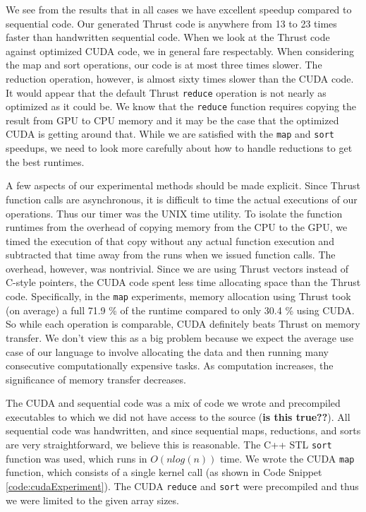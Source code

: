 \documentclass[twocolumn]{article}
\renewcommand{\|}{\origbar} %
\newcommand{\code}[1]{\texttt{#1}}
\begin{document}
We see from the results that in all cases we have excellent speedup compared to sequential code. Our generated Thrust code is anywhere from 13 to 23 times faster than handwritten sequential code. When we look at the Thrust code against optimized CUDA code, we in general fare respectably. When considering the map and sort operations, our code is at most three times slower. The reduction operation, however, is almost sixty times slower than the CUDA code. It would appear that the default Thrust \code{reduce} operation is not nearly as optimized as it could be. We know that the \code{reduce} function requires copying the result from GPU to CPU memory and it may be the case that the optimized CUDA is getting around that. While we are satisfied with the \code{map} and \code{sort} speedups, we need to look more carefully about how to handle reductions to get the best runtimes. 

A few aspects of our experimental methods should be made explicit. Since Thrust function calls are asynchronous, it is difficult to time the actual executions of our operations. Thus our timer was the UNIX time utility. To isolate the function runtimes from the overhead of copying memory from the CPU to the GPU, we timed the execution of that copy without any actual function execution and subtracted that time away from the runs when we issued function calls. The overhead, however, was nontrivial. Since we are using Thrust vectors instead of C-style pointers, the CUDA code spent less time allocating space than the Thrust code. Specifically, in the \code{map} experiments, memory allocation using Thrust took (on average) a full 71.9 \% of the runtime compared to only 30.4 \% using CUDA. So while each operation is comparable, CUDA definitely beats Thrust on memory transfer. We don't view this as a big problem because we expect the average use case of our language to involve allocating the data and then running many consecutive computationally expensive tasks. As computation increases, the significance of memory transfer decreases.

The CUDA and sequential code was a mix of code we wrote and precompiled executables to which we did not have access to the source ({\bf is this true??}). All sequential code was handwritten, and since sequential maps, reductions, and sorts are very straightforward, we believe this is reasonable. The C++ STL \code{sort} function was used, which runs in $O(nlog(n))$ time. We wrote the CUDA \code{map} function, which consists of a single kernel call (as shown in Code Snippet \ref{code:cudaExperiment}). The CUDA \code{reduce} and \code{sort} were precompiled and thus we were limited to the given array sizes. 
\end{document}
